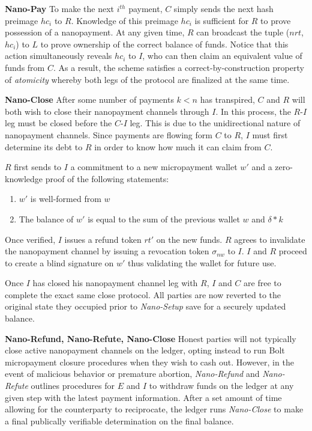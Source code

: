 \textbf{Nano-Pay} To make the next $i^{th}$ payment, $C$ simply sends the next
hash preimage $hc_i$ to $R$. Knowledge of this preimage $hc_i$ is sufficient for
$R$ to prove possession of a nanopayment. At any given time, $R$ can broadcast
the tuple ($nrt$, $hc_i$) to $L$ to prove ownership of the correct balance of
funds. Notice that this action simultaneously reveals $hc_i$ to $I$, who can
then claim an equivalent value of funds from $C$. As a result, the
scheme satisfies a correct-by-construction property of \emph{atomicity}
whereby both legs of the protocol are finalized at the same time.

\textbf{Nano-Close} After some number of payments $k < n$ has transpired, $C$ and $R$ will both wish
to close their nanopayment channels through $I$. In this process, the $R$-$I$ leg
must be closed before the $C$-$I$ leg. This is due to the unidirectional nature
of nanopayment channels. Since payments are flowing form $C$ to $R$, $I$ must
first determine its debt to $R$ in order to know how much it can claim from $C$.

$R$ first sends to $I$ a commitment to a new micropayment wallet $w'$ and a
zero-knowledge proof of the following statements:

\begin{enumerate}
\item $w'$ is well-formed from $w$
\item The balance of $w'$ is equal to the sum of the previous wallet $w$ and
  $\delta * k$
\end{enumerate}

Once verified, $I$ issues a refund token $rt'$ on the new funds. $R$ agrees to
invalidate the nanopayment channel by issuing a revocation token $\sigma_{nw}$
to $I$. $I$ and $R$ proceed to create a blind signature on $w'$ thus validating
the wallet for future use.

Once $I$ has closed his nanopayment channel leg with $R$, $I$ and $C$ are free
to complete the exact same close protocol. All parties are now reverted to the
original state they occupied prior to \emph{Nano-Setup} save for a securely updated
balance.

\textbf{Nano-Refund, Nano-Refute, Nano-Close} Honest parties will not typically
close active nanopayment channels on the ledger, opting instead to run Bolt
micropayment closure procedures when they wish to cash out. However, in the
event of malicious behavior or premature abortion, \emph{Nano-Refund} and
\emph{Nano-Refute} outlines procedures for $E$ and $I$ to withdraw funds on the
ledger at any given step with the latest payment information. After a set amount
of time allowing for the counterparty to reciprocate, the ledger runs
\emph{Nano-Close} to make a final publically verifiable determination on the
final balance.


